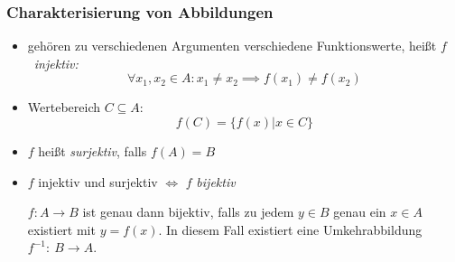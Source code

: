 \subsubsection*{Charakterisierung von Abbildungen}
\begin{itemize}
 \item gehören zu verschiedenen Argumenten verschiedene Funktionswerte, heißt $f$~\emph{injektiv:}
\[\forall x_1,x_2 \in A: x_1 \neq x_2 \implies f(x_1) \neq f(x_2)\]
 \item Wertebereich $C \subseteq A$:
\[ f(C) = \{f(x)|x\in C\} \]
 \item $f$ heißt \emph{surjektiv}, falls $f(A)=B$
 \item $f$ injektiv und surjektiv $\Leftrightarrow$ $f$ \emph{bijektiv}

$f: A \to B$ ist genau dann bijektiv, falls zu jedem $y \in B$ genau ein $x \in A $ existiert mit $y=f(x)$. In diesem Fall existiert eine Umkehrabbildung $f^{-1}:~B \to A$.
\end{itemize}

\endgroup